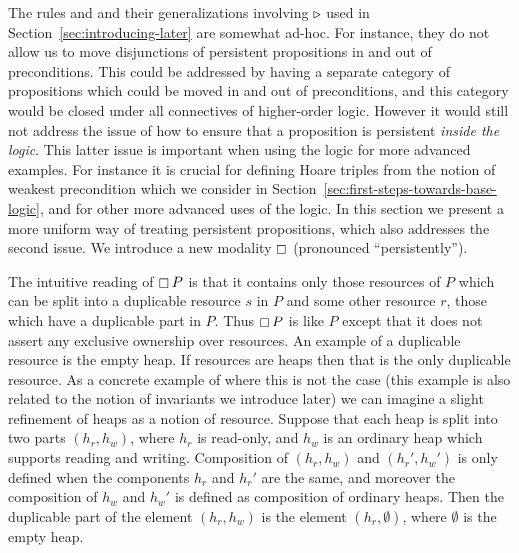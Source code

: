 \newcommand{\perstruerule}[1][]
{\rulegen[#1]{persistently-True}{}{\TRUE \provesIff \persistently{\TRUE}}}
\newcommand{\perstermeqrule}[1][]
{\rulegen[#1]{persistently-Eq}{}{t =_\tau t' \provesIff \persistently (t =_\tau t')}}
\newcommand{\pershtrule}[1][]
{\rulegen[#1]{persistently-Ht}{}{\hoare{P}{e}{\Phi} \provesIff \persistently \hoare{P}{e}{\Phi}}}
The rules  and  and their generalizations involving $\mathop{{\triangleright}}$ used in Section~\ref{sec:introducing-later} are somewhat ad-hoc.
For instance, they do not allow us to move disjunctions of persistent propositions in and out of preconditions.
This could be addressed by having a separate category of propositions which could be moved in and out of preconditions, and this category would be closed under all connectives of higher-order logic.
However it would still not address the issue of how to ensure that a proposition is persistent \emph{inside the logic}.
This latter issue is important when using the logic for more advanced examples.
For instance it is crucial for defining Hoare triples from the notion of weakest precondition which we consider in Section~\ref{sec:first-steps-towards-base-logic}, and for other more advanced uses of the logic.
In this section we present a more uniform way of treating persistent propositions, which also addresses the second issue.
We introduce a new modality $\mathop{\boxempty}$ (pronounced ``persistently'').

The intuitive reading of $\mathop{\boxempty} P$ is that it contains only those resources of $P$ which can be split into a duplicable resource $s$ in $P$ and some other resource $r$, \ie{} those which have a duplicable part in $P$.
Thus $\mathop{\boxempty} P$ is like $P$ except that it does not assert any exclusive ownership over resources.
An example of a duplicable resource is the empty heap.
If resources are heaps then that is the only duplicable resource.
As a concrete example of where this is not the case (this example is also related to the notion of invariants we introduce later) we can imagine a slight refinement of heaps as a notion of resource.
Suppose that each heap is split into two parts $(h_r, h_w)$, where $h_r$ is read-only, and $h_w$ is an ordinary heap which supports reading and writing.
Composition of $(h_r, h_w)$ and $(h_r', h_w')$ is only defined when the components $h_r$ and $h_r'$ are the same, and moreover the composition of $h_w$ and $h_w'$ is defined as composition of ordinary heaps.
Then the duplicable part of the element $(h_r, h_w)$ is the element $(h_r, \emptyset)$, where $\emptyset$ is the empty heap.

